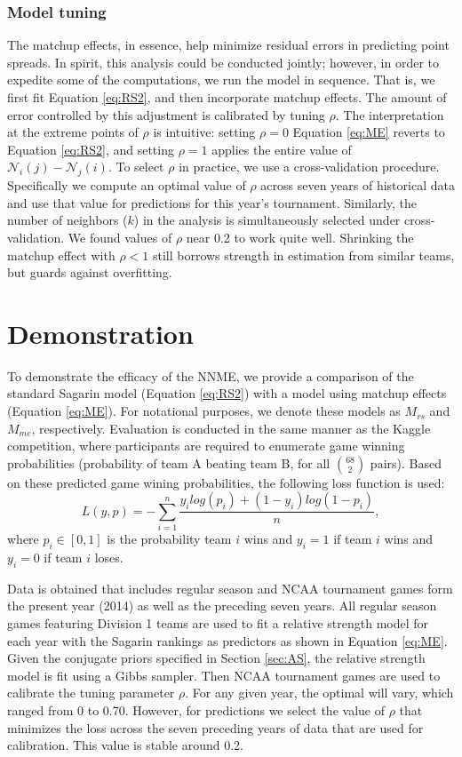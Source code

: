\documentclass[letterpaper,12pt]{article}
\begin{document}
\subsubsection{Model tuning\label{sec:tuning}}
The matchup effects, in essence, help minimize residual errors in predicting point spreads. In spirit, this analysis could be conducted jointly; however, in order to expedite some of the computations, we run the model in sequence. That is, we first fit Equation \ref{eq:RS2}, and then incorporate matchup effects. The amount of error controlled by this adjustment is calibrated by tuning $\rho$. 
The interpretation at the extreme points of $\rho$ is intuitive: setting $\rho = 0$ Equation \ref{eq:ME} reverts to Equation \ref{eq:RS2}, and setting $\rho = 1$ applies the entire value of $\mathcal{N}_i(j) -\mathcal{N}_j(i)$. To select $\rho$ in practice, we use a cross-validation procedure. Specifically we compute an optimal value of $\rho$ across seven years of historical data and use that value for predictions for this year's tournament. Similarly, the number of neighbors ($k$) in the analysis is simultaneously selected under cross-validation. We found values of $\rho$ near 0.2 to work quite well. Shrinking the matchup effect with $\rho <1$ still borrows strength in estimation from similar teams, but guards against overfitting.


\section{Demonstration \label{sec:demon}}
To demonstrate the efficacy of the NNME, we provide a comparison of the standard Sagarin model (Equation \ref{eq:RS2}) with a model using matchup effects (Equation \ref{eq:ME}). For notational purposes, we denote these models as $M_{rs}$ and $M_{me}$, respectively. Evaluation is conducted in the same manner as the Kaggle competition, where participants are required to enumerate game winning probabilities (probability of team A beating team B, for all $68 \choose 2$ pairs). Based on these predicted game wining probabilities, the following loss function is used:
\begin{equation}\label{eq:kaggle_score}
L(y,p)=-\sum_{i=1}^n\frac{y_ilog(p_i)+ (1-y_i)log(1-p_i)}{n},
\end{equation}
where $p_i\in[0,1]$ is the probability team $i$ wins and $y_i=1$ if team $i$ wins and $y_i = 0$ if team $i$ loses.

Data is obtained that includes regular season and NCAA tournament games form the present year (2014) as well as the preceding seven years. All regular season games featuring Division 1 teams are used to fit a relative strength model for each year with the Sagarin rankings as predictors as shown in Equation \ref{eq:ME}. Given the conjugate priors specified in Section \ref{sec:AS}, the relative strength model is fit using a Gibbs sampler. Then NCAA tournament games are used to calibrate the tuning parameter $\rho$. For any given year, the optimal will vary, which ranged from 0 to 0.70. However, for predictions we select the value of $\rho$ that minimizes the loss across the seven preceding years of data that are used for calibration. This value is stable around 0.2.
\end{document}
